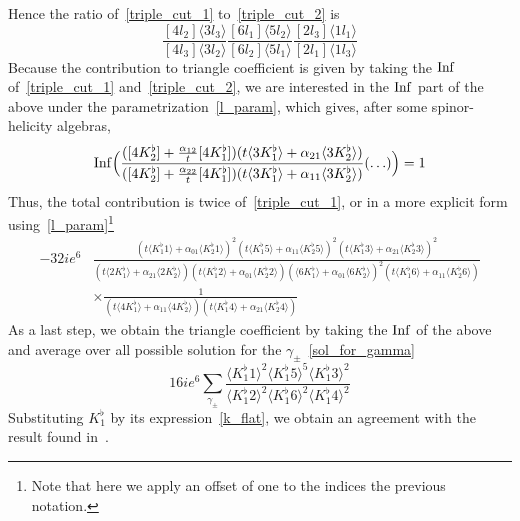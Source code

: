 Hence the ratio of~\cref{triple_cut_1} to~\cref{triple_cut_2} is
\begin{equation}
\frac{[4l_2]\langle 3l_3\rangle}{[4l_3]\langle 3l_2\rangle}
\frac{[6l_1]\langle 5l_2\rangle}{[6l_2]\langle 5l_1\rangle}
\frac{[2l_3]\langle 1l_1\rangle}{[2l_1]\langle 1l_3\rangle}
\end{equation}
\fi
%
Because the contribution to triangle coefficient is given by taking the $\mathrm{Inf}$ of~\cref{triple_cut_1} and~\cref{triple_cut_2}, we are interested in the $\mathrm{Inf}$ part of the above under the parametrization~\cref{l_param}, which gives, after some spinor-helicity algebras,
\begin{equation}
\mathrm{Inf}\Big(\frac{([4K_2^\flat] + \frac{\alpha_{12}}{t}[4K_1^\flat])(t\langle 3K_1^\flat \rangle + \alpha_{21}\langle 3K_2^\flat\rangle)}{([4K_2^\flat] + \frac{\alpha_{22}}{t}[4K_1^\flat])(t\langle 3K_1^\flat \rangle + \alpha_{11}\langle 3K_2^\flat\rangle)}(\ldots)\Big)
= 1
\end{equation} 
%
Thus, the total contribution is twice of~\ref{triple_cut_1}, or in a more explicit form using~\cref{l_param}\footnote{
Note that here we apply an offset of one to the indices \wrt the previous notation.
}
\begin{equation}
\begin{split}
-32ie^6 & \frac{(t\langle K_1^\flat 1 \rangle + \alpha_{01}\langle K_2^\flat 1\rangle)^2
(t\langle K_1^\flat 5 \rangle + \alpha_{11}\langle K_2^\flat 5\rangle)^2
(t\langle K_1^\flat 3 \rangle + \alpha_{21}\langle K_2^\flat 3\rangle)^2
}{
(t\langle 2K_1^\flat  \rangle + \alpha_{21}\langle 2 K_2^\flat \rangle)
(t\langle K_1^\flat 2 \rangle + \alpha_{01}\langle K_2^\flat 2\rangle)
(\langle  6K_1^\flat  \rangle + \alpha_{01}\langle  6K_2^\flat \rangle)^2
(t\langle K_1^\flat 6 \rangle + \alpha_{11}\langle K_2^\flat 6\rangle)}
\\
&\times
\frac{1}{
(t\langle 4K_1^\flat  \rangle + \alpha_{11}\langle 4 K_2^\flat \rangle)
(t\langle K_1^\flat 4 \rangle + \alpha_{21}\langle K_2^\flat 4 \rangle)
}
\end{split}
\end{equation}
As a last step, we obtain the triangle coefficient by taking the $\mathrm{Inf}$ of the above and average over all possible solution for the $\gamma_\pm$~\cref{sol_for_gamma}
\begin{equation}
16ie^6\sum_{\gamma_\pm}\frac{\langle K_1^\flat 1 \rangle^2\langle K_1^\flat 5\rangle^5 \langle K_1^\flat 3 \rangle^2}{\langle K_1^\flat 2 \rangle^2\langle K_1^\flat 6\rangle^2 \langle K_1^\flat 4 \rangle^2}
\end{equation}
Substituting $K_1^\flat$ by its expression~\cref{k_flat}, we obtain an agreement with the result found in~\cite{Forde:2007mi}.










